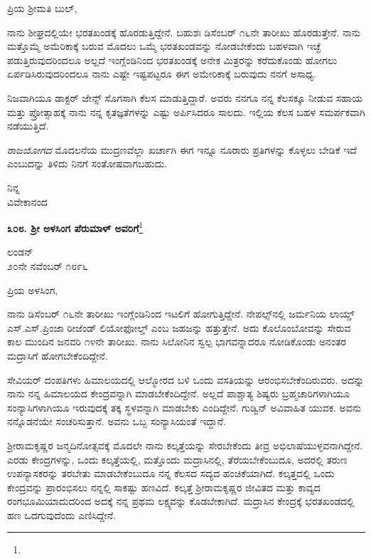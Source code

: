 \noindent
ಪ್ರಿಯ ಶ‍್ರೀಮತಿ ಬುಲ್,

ನಾನು ಶೀಘ್ರದಲ್ಲಿಯೇ ಭರತಖಂಡಕ್ಕೆ ಹೊರಡುತ್ತಿದ್ದೇನೆ. ಬಹುಶಃ ಡಿಸೆಂಬರ್ ೧೬ನೇ ತಾರೀಖು ಹೊರಡುತ್ತೇನೆ. ನಾನು ಮತ್ತೊಮ್ಮೆ ಅಮೆರಿಕಾಕ್ಕೆ ಬರುವ ಮೊದಲು ಒಮ್ಮೆ ಭರತಖಂಡವನ್ನು ನೋಡಬೇಕೆಂದು ಬಹಳವಾಗಿ ಇಚ್ಛೆ ಪಡುತ್ತಿರುವುದರಿಂದಲೂ ಅಲ್ಲದೆ ಇಂಗ್ಲೆಂಡಿನಿಂದ ಭರತಖಂಡಕ್ಕೆ ಅನೇಕ ಮಿತ್ರರನ್ನು ಕರೆದುಕೊಂಡು ಹೋಗಲು ಏರ್ಪಡಿಸಿರುವುದರಿಂದಲೂ ನಾನು ಎಷ್ಟೇ ಇಷ್ಟಪಟ್ಟರೂ ಈಗ ಅಮೇರಿಕಾಕ್ಕೆ ಬರುವುದು ನನಗೆ ಅಸಾಧ್ಯ.

ನಿಜವಾಗಿಯೂ ಡಾಕ್ಟರ್‌ ಜೇನ್ಸ್ ಸೊಗಸಾಗಿ ಕೆಲಸ ಮಾಡುತ್ತಿದ್ದಾರೆ. ಅವರು ನನಗೂ ನನ್ನ ಕೆಲಸಕ್ಕೂ ನೀಡುವ ಸಹಾಯ ಮತ್ತು ಪ್ರೋತ್ಸಾಹಕ್ಕೆ ನಾನು ನನ್ನ ಕೃತಜ್ಞತೆಗಳನ್ನು ಎಷ್ಟು ಅರ್ಪಿಸಿದರೂ ಸಾಲದು. ಇಲ್ಲಿಯ ಕೆಲಸ ಬಹಳ ಸಮರ್ಪಕವಾಗಿ ನಡೆಯುತ್ತಿದೆ.

\textit{ರಾಜಯೋಗದ} ಮೊದಲನೆಯ ಮುದ್ರಣವೆಲ್ಲಾ ಖರ್ಚಾಗಿ ಈಗ ಇನ್ನೂ ನೂರಾರು ಪ್ರತಿಗಳನ್ನು ಕೊಳ್ಳಲು ಬೇಡಿಕೆ ಇದೆ ಎಂಬುದನ್ನು ತಿಳಿದು ನಿನಗೆ ಸಂತೋಷವಾಗಬಹುದು.

{\flushright
ನಿನ್ನ\\ವಿವೇಕಾನಂದ\par}

\begin{center}
\textbf{೩೦೮. ಶ‍್ರೀ ಅಳಸಿಂಗ ಪೆರುಮಾಳ್ ಅವರಿಗೆ}\footnote{}
\end{center}

\begin{flushright}
ಲಂಡನ್\\೨೦ನೇ ನವೆಂಬರ್ ೧೮೯೬
\end{flushright}

\noindent
ಪ್ರಿಯ ಅಳಸಿಂಗ,

ನಾನು ಡಿಸೆಂಬರ್ ೧೬ನೇ ತಾರೀಖು ಇಂಗ್ಲೆಂಡಿನಿಂದ ಇಟಲಿಗೆ ಹೋಗುತ್ತಿದ್ದೇನೆ. ನೇಪಲ್ಸ್‌ನಲ್ಲಿ ಜರ್ಮನಿಯ ಲಾಯ್ಡ್‌ ಎಸ್‌.ಎಸ್‌.ಪ್ರಿಂಜಾ ರೀಜೆಂಡ್ ಲಿಯೋಫೋಲ್ಡ್ ಎಂಬ ಜಹಜನ್ನು ಹತ್ತುತ್ತೇನೆ. ಅದು ಕೊಲೊಂಬೋವನ್ನು ಸೇರುವ ಕಾಲ ಮುಂದಿನ ಜನವರಿ ೧೪ನೇ ತಾರೀಖು. ನಾನು ಸಿಲೋನಿನ ಸ್ವಲ್ಪ ಭಾಗವನ್ನಾದರೂ ನೋಡಿಕೊಂಡು ಅನಂತರ ಮದ್ರಾಸಿಗೆ ಹೋಗಬೇಕೆಂದಿದ್ದೇನೆ.

ಸೇವಿಯರ್ ದಂಪತಿಗಳು ಹಿಮಾಲಯದಲ್ಲಿ ಆಲ್ಮೋರದ ಬಳಿ ಒಂದು ವಸತಿಯನ್ನು ಆರಂಭಿಸಬೇಕೆಂದಿರುವರು. ಅದನ್ನು ನಾನು ನನ್ನ ಹಿಮಾಲಯದ ಕೇಂದ್ರವನ್ನಾಗಿ ಮಾಡಬೇಕೆಂದಿದ್ದೇನೆ. ಅಲ್ಲದೆ ಪಾಶ್ಚಾತ್ಯ ಶಿಷ್ಯರು ಬ್ರಹ್ಮಚಾರಿಗಳಾಗಿಯೂ ಸಂನ್ಯಾಸಿಗಳಾಗಿಯೂ ಇರುವುದಕ್ಕೆ ತಕ್ಕ ಸ್ಥಳವನ್ನಾಗಿ ಮಾಡಬೇಕು ಎಂದಿದ್ದೇನೆ. ಗುಡ್ವಿನ್ ಅವಿವಾಹಿತ ಯುವಕ. ಅವನು ನನ್ನೊಡನೆಯೇ ಸಂಚರಿಸುತ್ತಾನೆ. ಅವನು ಒಬ್ಬ ಸಂನ್ಯಾಸಿಯಂತೆ ಇದ್ದಾನೆ.

ಶ‍್ರೀರಾಮಕೃಷ್ಣರ ಜನ್ಮದಿನೋತ್ಸವಕ್ಕೆ ಮೊದಲೇ ನಾನು ಕಲ್ಕತ್ತೆಯನ್ನು ಸೇರಬೇಕೆಂದು ತೀವ್ರ ಅಭಿಲಾಷೆಯುಳ್ಳವನಾಗಿದ್ದೇನೆ. ಎರಡು ಕೇಂದ್ರಗಳನ್ನು, ಒಂದು ಕಲ್ಕತ್ತೆಯಲ್ಲಿ, ಮತ್ತೊಂದು ಮದ್ರಾಸಿನಲ್ಲಿ, ತೆರೆಯಬೇಕೆಂಬುದೂ, ಅದರಲ್ಲಿ ತರುಣ ಉಪನ್ಯಾಸಕರನ್ನು ತರಬೇತು ಮಾಡಬೇಕೆಂಬುದೂ ನನ್ನ ಕೆಲಸದ ಸದ್ಯದ ಹಂಚಿಕೆಯಾಗಿದೆ. ಕಲ್ಕತ್ತದಲ್ಲಿ ಒಂದು ಕೇಂದ್ರವನ್ನು ಪ್ರಾರಂಭಿಸಲು ನನ್ನಲ್ಲಿ ಸಾಕಷ್ಟು ಹಣವಿದೆ. ಕಲ್ಕತ್ತೆ ಶ‍್ರೀರಾಮಕೃಷ್ಣರ ಜೀವಿತದ ಮತ್ತು ಕಾವ್ಯದ ರಂಗಭೂಮಿಯಾದುದರಿಂದ ಅದಕ್ಕೆ ನನ್ನ ಪ್ರಥಮ ಲಕ್ಷ್ಯವನ್ನು ಕೊಡಬೇಕಾಗಿದೆ. ಮದ್ರಾಸಿನ ಕೇಂದ್ರಕ್ಕೆ ಭರತಖಂಡದಲ್ಲಿ ಹಣ ಒದಗುವುದೆಂದು ಎಣಿಸಿದ್ದೇನೆ.


